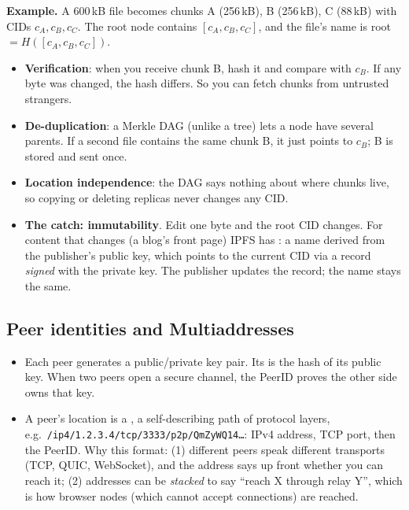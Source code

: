 \textbf{Example.} A 600\,kB file becomes chunks A (256\,kB), B (256\,kB), C (88\,kB) with CIDs $c_A, c_B, c_C$. The root node contains $[c_A, c_B, c_C]$, and the file's
name is root $= H([c_A, c_B, c_C])$.
\begin{itemize}
  \item \textbf{Verification}: when you receive chunk B, hash it and compare with $c_B$. If any byte was changed, the hash differs. So you can fetch chunks from
        untrusted strangers.
  \item \textbf{De-duplication}: a Merkle DAG (unlike a tree) lets a node have several parents. If a second file contains the same chunk B, it just points to $c_B$; B is
        stored and sent once.
  \item \textbf{Location independence}: the DAG says nothing about where chunks live, so copying or deleting replicas never changes any CID.
  \item \textbf{The catch: immutability}. Edit one byte and the root CID changes. For content that changes (a blog's front page) IPFS has : a name derived from
        the publisher's public key, which points to the current CID via a record \emph{signed} with the private key. The publisher updates the record; the name stays the same.
\end{itemize}

\subsection{Peer identities and Multiaddresses}
\begin{itemize}
  \item Each peer generates a public/private key pair. Its  is the hash of its public key. When two peers open a secure channel, the PeerID proves the other side
        owns that key.
  \item A peer's location is a , a self-describing path of protocol layers, e.g.\ \texttt{/ip4/1.2.3.4/tcp/3333/p2p/QmZyWQ14\dots}: IPv4 address,
        TCP port, then the PeerID. Why this format: (1) different peers speak different transports (TCP, QUIC, WebSocket), and the address says up front whether you can
        reach it; (2) addresses can be \emph{stacked} to say ``reach X through relay Y'', which is how browser nodes (which cannot accept connections) are reached.
\end{itemize}

